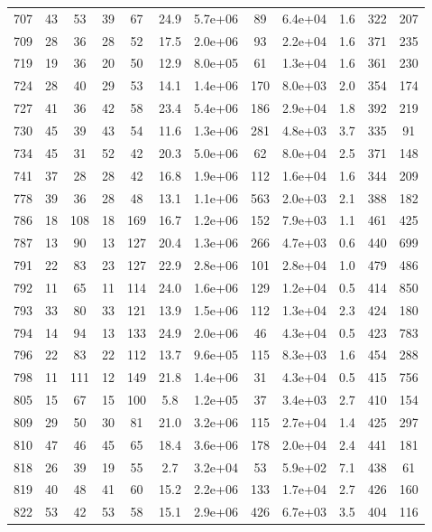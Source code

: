 \begin{table}
\begin{tabular}{cccccccccccc}
707 & 43 & 53 & 39 & 67 & 24.9 & 5.7e+06 & 89 & 6.4e+04 & 1.6 & 322 & 207 \\
709 & 28 & 36 & 28 & 52 & 17.5 & 2.0e+06 & 93 & 2.2e+04 & 1.6 & 371 & 235 \\
719 & 19 & 36 & 20 & 50 & 12.9 & 8.0e+05 & 61 & 1.3e+04 & 1.6 & 361 & 230 \\
724 & 28 & 40 & 29 & 53 & 14.1 & 1.4e+06 & 170 & 8.0e+03 & 2.0 & 354 & 174 \\
727 & 41 & 36 & 42 & 58 & 23.4 & 5.4e+06 & 186 & 2.9e+04 & 1.8 & 392 & 219 \\
730 & 45 & 39 & 43 & 54 & 11.6 & 1.3e+06 & 281 & 4.8e+03 & 3.7 & 335 & 91 \\
734 & 45 & 31 & 52 & 42 & 20.3 & 5.0e+06 & 62 & 8.0e+04 & 2.5 & 371 & 148 \\
741 & 37 & 28 & 28 & 42 & 16.8 & 1.9e+06 & 112 & 1.6e+04 & 1.6 & 344 & 209 \\
778 & 39 & 36 & 28 & 48 & 13.1 & 1.1e+06 & 563 & 2.0e+03 & 2.1 & 388 & 182 \\
786 & 18 & 108 & 18 & 169 & 16.7 & 1.2e+06 & 152 & 7.9e+03 & 1.1 & 461 & 425 \\
787 & 13 & 90 & 13 & 127 & 20.4 & 1.3e+06 & 266 & 4.7e+03 & 0.6 & 440 & 699 \\
791 & 22 & 83 & 23 & 127 & 22.9 & 2.8e+06 & 101 & 2.8e+04 & 1.0 & 479 & 486 \\
792 & 11 & 65 & 11 & 114 & 24.0 & 1.6e+06 & 129 & 1.2e+04 & 0.5 & 414 & 850 \\
793 & 33 & 80 & 33 & 121 & 13.9 & 1.5e+06 & 112 & 1.3e+04 & 2.3 & 424 & 180 \\
794 & 14 & 94 & 13 & 133 & 24.9 & 2.0e+06 & 46 & 4.3e+04 & 0.5 & 423 & 783 \\
796 & 22 & 83 & 22 & 112 & 13.7 & 9.6e+05 & 115 & 8.3e+03 & 1.6 & 454 & 288 \\
798 & 11 & 111 & 12 & 149 & 21.8 & 1.4e+06 & 31 & 4.3e+04 & 0.5 & 415 & 756 \\
805 & 15 & 67 & 15 & 100 & 5.8 & 1.2e+05 & 37 & 3.4e+03 & 2.7 & 410 & 154 \\
809 & 29 & 50 & 30 & 81 & 21.0 & 3.2e+06 & 115 & 2.7e+04 & 1.4 & 425 & 297 \\
810 & 47 & 46 & 45 & 65 & 18.4 & 3.6e+06 & 178 & 2.0e+04 & 2.4 & 441 & 181 \\
818 & 26 & 39 & 19 & 55 & 2.7 & 3.2e+04 & 53 & 5.9e+02 & 7.1 & 438 & 61 \\
819 & 40 & 48 & 41 & 60 & 15.2 & 2.2e+06 & 133 & 1.7e+04 & 2.7 & 426 & 160 \\
822 & 53 & 42 & 53 & 58 & 15.1 & 2.9e+06 & 426 & 6.7e+03 & 3.5 & 404 & 116 \\

\end{tabular}
\end{table}
